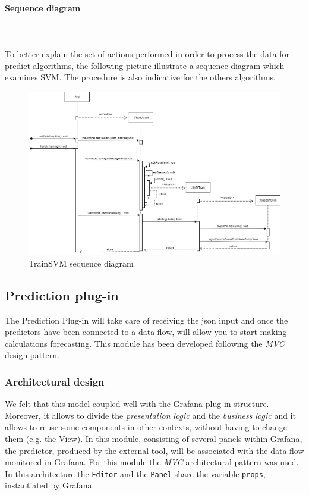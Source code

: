 \paragraph*{Sequence diagram}\mbox{} \\ \mbox{} \\
To better explain the set of actions performed in order to process the data for
predict algorithms, the following picture illustrate a sequence diagram which examines SVM. The procedure is also indicative for the others algorithms.

\begin{landscape}
\begin{center}
\begin{figure}[H]
\centering
\includegraphics[scale=0.60]{../../../Diagrams/Sequence_diagrams/trainSVM.png}
\caption{TrainSVM sequence diagram}
\end{figure}
\end{center}
\end{landscape}

\subsection{Prediction plug-in}
The Prediction Plug-in will take care of receiving the json input and once the predictors have been connected to a data flow, will allow you to start making calculations forecasting. This module has been developed following the \textit{MVC} design pattern.

\subsubsection{Architectural design}
We felt that this model coupled well with the Grafana plug-in structure.
Moreover, it allows to divide the \textit{presentation logic} and the \textit{business logic} and it allows to reuse some components in other contexts, without having to change them (e.g. the View).
In this module, consisting of several panels within Grafana, the predictor, produced by the external tool, will be associated with the data flow monitored in Grafana. For this module the \textit{MVC} architectural pattern was used. In this architecture the \texttt{Editor} and the \texttt{Panel} share the variable \texttt{props}, instantiated by Grafana.

